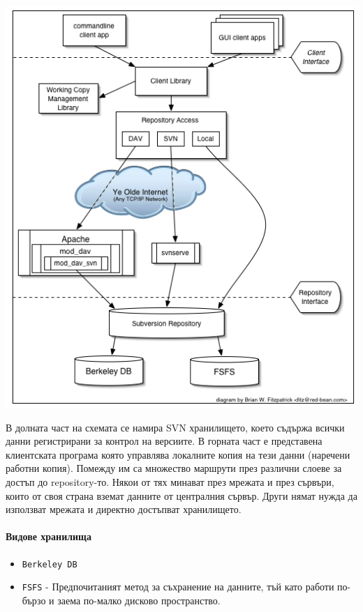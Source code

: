 \documentclass[a4paper]{article}
\begin{document}
    \begin{center}
      \includegraphics[scale=0.5]{svn_architecture}
    \end{center}

    В долната част на схемата се намира SVN хранилището, което съдържа всички
    данни регистрирани за контрол на версиите. В горната част е представена
    клиентската програма която управлява локалните копия на тези данни
    (наречени работни копия). Помежду им са множество маршрути през различни
    слоеве за достъп до repository-то. Някои от тях минават през мрежата и през
    сървъри, които от своя страна вземат данните от централния сървър. Други
    нямат нужда да използват мрежата и директно достъпват хранилището.

    \paragraph{Видове хранилища}

    \begin{itemize}
      \item \texttt{Berkeley DB}
      \item \texttt{FSFS} - Предпочитаният метод за съхранение на данните, тъй като работи по-бързо и заема по-малко дисково пространство.
    \end{itemize}
\end{document}
